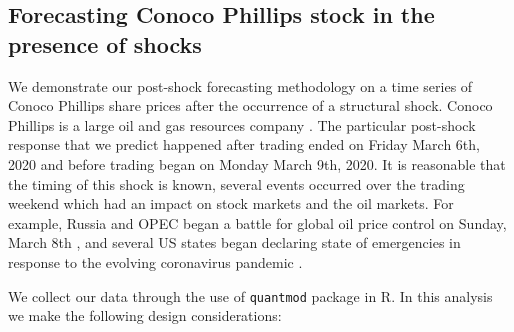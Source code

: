 \documentclass[11pt,3p,review,authoryear]{elsarticle}
\theoremstyle{definition}
\begin{document}
\subsection{Forecasting Conoco Phillips stock in the presence of shocks}
\label{forecasting}

We demonstrate our post-shock forecasting methodology on a time series of Conoco Phillips share prices after the occurrence of a structural shock. Conoco Phillips is a large oil and gas resources company \citep{conocowhatwedo}. The particular post-shock response that we predict happened after trading ended on Friday March 6th, 2020 and before trading began on Monday March 9th, 2020. It is reasonable that the timing of this shock is known, several events occurred over the trading weekend which had an impact on stock markets and the oil markets. For example, Russia and OPEC began a battle for global oil price control on Sunday, March 8th \citep{sukhankin2020russian}, and several US states began declaring state of emergencies in response to the evolving coronavirus pandemic \citep{nygov, alonso2020state}. 

We collect our data through the use of \texttt{quantmod} package \citep{ryan2017quantmod} in R. In this analysis we make the following design considerations:
\end{document}
